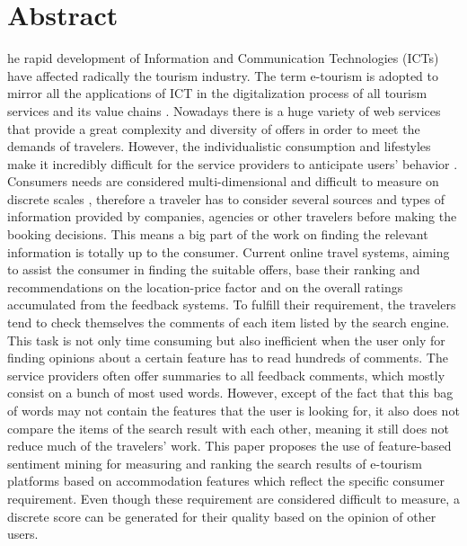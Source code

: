 %
%
%
\chapter{Abstract}
\begin{SingleSpace}
he rapid development of Information and Communication Technologies (ICTs) have affected radically the tourism industry. The term e-tourism is adopted to mirror all the applications of ICT in the digitalization process of all tourism services and its value chains \cite{buhalis2003etourism}. Nowadays there is a huge variety of web services that provide a great complexity and diversity of offers in order to meet the demands of travelers. However, the individualistic consumption and lifestyles make it incredibly difficult for the service providers to anticipate users' behavior \cite{niemann2008enhancing}. Consumers needs are considered multi-dimensional and difficult to measure on discrete scales \cite{luo2005information}, therefore a traveler has to consider several sources and types of information provided by companies, agencies or other travelers before making the booking decisions. This means a big part of the work on finding the relevant information is totally up to the consumer. 
Current online travel systems, aiming to assist the consumer in finding the suitable offers, base their ranking and recommendations on the location-price factor and on the overall ratings accumulated from the feedback systems. To fulfill their requirement, the travelers tend to check themselves the comments of each item listed by the search engine. This task is not only time consuming but also inefficient when the user only for finding opinions about a certain feature has to read hundreds of comments. The service providers often offer summaries to all feedback comments, which mostly consist on a bunch of most used words. However, except of the fact that this bag of words may not contain the features that the user is looking for, it also does not compare the items of the search result with each other, meaning it still does not reduce much of the travelers' work.  This paper proposes the use of feature-based sentiment mining for measuring and ranking the search results of e-tourism platforms based on accommodation features which reflect the specific consumer requirement. Even though these requirement are considered difficult to measure, a discrete score can be generated for their quality based on the opinion of other users.
\end{SingleSpace}
\clearpage